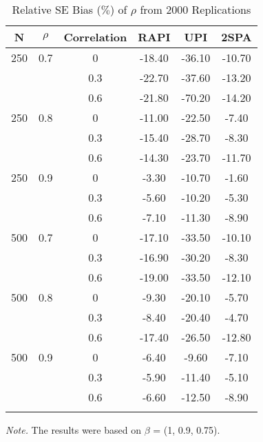 \documentclass[
  man]{apa7}
\begin{document}
\begin{table}[tbp]

\begin{center}
\begin{threeparttable}

\caption{\label{tab:unnamed-chunk-2}Relative SE Bias ($\%$) of $\rho$ from 2000 Replications}

\begin{tabular}{cccccc}
\toprule
N & \multicolumn{1}{c}{$\rho$} & \multicolumn{1}{c}{Correlation} & \multicolumn{1}{c}{RAPI} & \multicolumn{1}{c}{UPI} & \multicolumn{1}{c}{2SPA}\\
\midrule
250 & 0.7 & 0 & -18.40 & -36.10 & -10.70\\
 &  & 0.3 & -22.70 & -37.60 & -13.20\\
 &  & 0.6 & -21.80 & -70.20 & -14.20\\
250 & 0.8 & 0 & -11.00 & -22.50 & -7.40\\
 &  & 0.3 & -15.40 & -28.70 & -8.30\\
 &  & 0.6 & -14.30 & -23.70 & -11.70\\
250 & 0.9 & 0 & -3.30 & -10.70 & -1.60\\
 &  & 0.3 & -5.60 & -10.20 & -5.30\\
 &  & 0.6 & -7.10 & -11.30 & -8.90\\
500 & 0.7 & 0 & -17.10 & -33.50 & -10.10\\
 &  & 0.3 & -16.90 & -30.20 & -8.30\\
 &  & 0.6 & -19.00 & -33.50 & -12.10\\
500 & 0.8 & 0 & -9.30 & -20.10 & -5.70\\
 &  & 0.3 & -8.40 & -20.40 & -4.70\\
 &  & 0.6 & -17.40 & -26.50 & -12.80\\
500 & 0.9 & 0 & -6.40 & -9.60 & -7.10\\
 &  & 0.3 & -5.90 & -11.40 & -5.10\\
 &  & 0.6 & -6.60 & -12.50 & -8.90\\
\bottomrule
\addlinespace
\end{tabular}

\begin{tablenotes}[para]
\normalsize{\textit{Note.} The results were based on $\beta$ = (1, 0.9, 0.75).}
\end{tablenotes}

\end{threeparttable}
\end{center}

\end{table}
\end{document}
